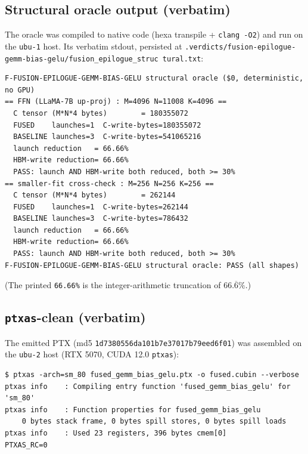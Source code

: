 \documentclass[11pt,a4paper]{article}
\begin{document}
\subsection{Structural oracle output (verbatim)}

The oracle was compiled to native code (hexa transpile + \texttt{clang -O2})
and run on the \texttt{ubu-1} host. Its verbatim stdout, persisted at
\texttt{.verdicts/fusion-epilogue-gemm-bias-gelu/fusion\_epilogue\_struc%
tural.txt}:

\begin{lstlisting}
F-FUSION-EPILOGUE-GEMM-BIAS-GELU structural oracle ($0, deterministic, no GPU)
== FFN (LLaMA-7B up-proj) : M=4096 N=11008 K=4096 ==
  C tensor (M*N*4 bytes)        = 180355072
  FUSED    launches=1  C-write-bytes=180355072
  BASELINE launches=3  C-write-bytes=541065216
  launch reduction   = 66.66%
  HBM-write reduction= 66.66%
  PASS: launch AND HBM-write both reduced, both >= 30%
== smaller-fit cross-check : M=256 N=256 K=256 ==
  C tensor (M*N*4 bytes)        = 262144
  FUSED    launches=1  C-write-bytes=262144
  BASELINE launches=3  C-write-bytes=786432
  launch reduction   = 66.66%
  HBM-write reduction= 66.66%
  PASS: launch AND HBM-write both reduced, both >= 30%
F-FUSION-EPILOGUE-GEMM-BIAS-GELU structural oracle: PASS (all shapes)
\end{lstlisting}
(The printed \texttt{66.66\%} is the integer-arithmetic truncation of
$66.\overline{6}\%$.)

\subsection{\texttt{ptxas}-clean (verbatim)}

The emitted PTX (md5 \texttt{1d7380556da101b7e37017b79eed6f01}) was assembled
on the \texttt{ubu-2} host (RTX 5070, CUDA 12.0 \texttt{ptxas}):

\begin{lstlisting}
$ ptxas -arch=sm_80 fused_gemm_bias_gelu.ptx -o fused.cubin --verbose
ptxas info    : Compiling entry function 'fused_gemm_bias_gelu' for 'sm_80'
ptxas info    : Function properties for fused_gemm_bias_gelu
    0 bytes stack frame, 0 bytes spill stores, 0 bytes spill loads
ptxas info    : Used 23 registers, 396 bytes cmem[0]
PTXAS_RC=0
\end{lstlisting}
\end{document}
